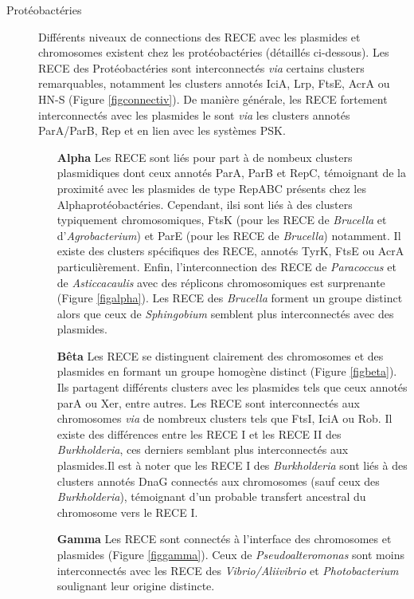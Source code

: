  \begin{description}
 \item[Protéobactéries] Différents niveaux de connections des RECE avec les plasmides et chromosomes existent chez les protéobactéries (détaillés ci-dessous). Les RECE des Protéobactéries sont interconnectés \textit{via} certains clusters remarquables, notamment les clusters annotés IciA, Lrp, FtsE, AcrA ou HN-S (Figure \ref{figconnectiv}). De manière générale, les RECE fortement interconnectés avec les plasmides le sont \textit{via} les clusters annotés ParA/ParB, Rep et en lien avec les systèmes PSK.

 	\begin{itemize}
 	\item[\textbf{Alpha}] Les RECE sont liés pour part à de nombeux clusters plasmidiques dont ceux annotés ParA, ParB et RepC, témoignant de la proximité avec les plasmides de type RepABC présents chez les Alphaprotéobactéries. Cependant, ilsi sont liés à des clusters typiquement chromosomiques, FtsK (pour les RECE de \textit{Brucella} et d'\textit{Agrobacterium}) et ParE (pour les RECE de \textit{Brucella}) notamment. Il existe des clusters spécifiques des RECE, annotés TyrK, FtsE ou AcrA particulièrement. Enfin, l'interconnection des RECE de \textit{Paracoccus} et de \textit{Asticcacaulis} avec des réplicons chromosomiques est surprenante (Figure \ref{figalpha}). Les RECE des \textit{Brucella} forment un groupe distinct alors que ceux de \textit{Sphingobium} semblent plus interconnectés avec des plasmides.
 	\item[\textbf{Bêta}] Les RECE se distinguent clairement des chromosomes et des plasmides en formant un groupe homogène distinct (Figure \ref{figbeta}). Ils partagent différents clusters avec les plasmides tels que ceux annotés parA ou Xer, entre autres. Les RECE sont interconnectés aux chromosomes \textit{via} de nombreux clusters tels que FtsI, IciA ou Rob. Il existe des différences entre les RECE I et les RECE II des \textit{Burkholderia}, ces derniers semblant plus interconnectés aux plasmides.Il est à noter que les RECE I des \textit{Burkholderia} sont liés à des clusters annotés DnaG connectés aux chromosomes (sauf ceux des \textit{Burkholderia}), témoignant d'un probable transfert ancestral du chromosome vers le RECE I. 
 	\item[\textbf{Gamma}] Les RECE sont connectés à l'interface des chromosomes et plasmides (Figure \ref{figgamma}). Ceux de \textit{Pseudoalteromonas} sont moins interconnectés avec les RECE des \textit{Vibrio/Aliivibrio} et \textit{Photobacterium} soulignant leur origine distincte.

\end{itemize}
\end{description}
